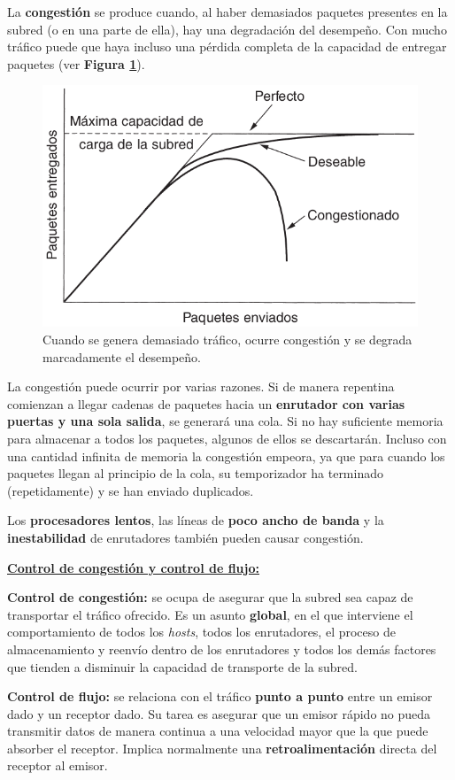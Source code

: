 \documentclass[10pt,a4paper]{article}
\begin{document}
La \textbf{congestión} se produce cuando, al haber demasiados paquetes presentes en la subred (o en una parte de ella), hay una degradación del desempeño. Con mucho tráfico puede que haya incluso una pérdida completa de la capacidad de entregar paquetes (ver \textbf{Figura \ref{fig:congestion}}).

\begin{figure}
  \caption{Cuando se genera demasiado tráfico, ocurre congestión y se degrada marcadamente
el desempeño.}
  \label{fig:congestion}  
  \centering
  \hbox{\includegraphics[width=0.5\textwidth-\fboxrule-\fboxrule]{imgs/congestion.png}}  
\end{figure}

La congestión puede ocurrir por varias razones. Si de manera repentina comienzan a llegar cadenas de paquetes hacia un \textbf{enrutador con varias puertas y una sola salida}, se generará una cola. Si no hay suficiente memoria para almacenar a todos los paquetes, algunos de ellos se descartarán. Incluso con una cantidad infinita de memoria la congestión empeora, ya que para cuando los paquetes llegan al principio de la cola, su temporizador ha terminado (repetidamente) y se han enviado duplicados.

Los \textbf{procesadores lentos}, las líneas de \textbf{poco ancho de banda} y la \textbf{inestabilidad} de enrutadores también pueden causar congestión.
\newline

\underline{\textbf{Control de congestión y control de flujo:}}
\begin{description}
\item \textbf{Control de congestión:} se ocupa de asegurar que la subred sea capaz de transportar el tráfico ofrecido. Es un asunto \textbf{global}, en el que interviene el comportamiento de todos los \textit{hosts}, todos los enrutadores, el proceso de almacenamiento y reenvío dentro de los enrutadores y todos los demás factores que tienden a disminuir la capacidad de transporte de la subred.
\item \textbf{Control de flujo:} se relaciona con el tráfico \textbf{punto a punto} entre un emisor dado y un receptor dado. Su tarea es asegurar que un emisor rápido no pueda transmitir datos de manera continua a una velocidad mayor que la que puede absorber el receptor. Implica normalmente una \textbf{retroalimentación} directa del receptor al emisor.
\end{description}
\end{document}

